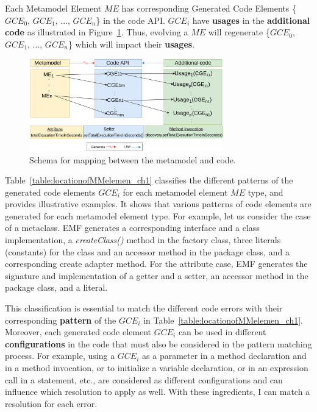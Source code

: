 Each Metamodel Element $ME$ has corresponding Generated Code Elements \{$GCE_0$, $GCE_1$, ..., $GCE_n$\} in the code API. 
$GCE_i$ have \textbf{usages} in the \textbf{additional code} as illustrated in Figure~\ref{fig:patternconcept}.
Thus, evolving a $ME$ will regenerate \{$GCE_0$, $GCE_1$, ..., $GCE_n$\} which will impact their \textbf{usages}. 
%
\begin{figure}[H]
	\centering
	\includegraphics[width=0.75\textwidth]{./pics/chapter1pics/patternusages.png}
	\caption{Schema for mapping between the metamodel and code.}
	\label{fig:patternconcept}
	\vspace{-1em}
	
\end{figure}


Table~\ref{table:locationofMMelemen_ch1} classifies the different patterns of the generated code elements $GCE_i$ for each metamodel element $ME$ type, and provides illustrative examples. It shows that various patterns of code elements are generated for each metamodel element type. %
For example, let us consider the case of a metaclass. EMF generates a corresponding interface and a class implementation, a \emph{createClass()} method in the factory class, three literals (\ie constants) for the class and an accessor method in the package class, and a corresponding create adapter method. For the attribute case, EMF generates the signature and implementation of a getter and a setter, an accessor method in the package class, and a literal. 

This classification is essential to match the different code errors with their corresponding \textbf{pattern} of the $GCE_i$ in Table~\ref{table:locationofMMelemen_ch1}. 
%
Moreover, each generated code element $GCE_i$ can be used in different \textbf{configurations} in the code that must also be considered in the pattern matching process. For example, using a $GCE_i$ as a parameter in a method declaration and in a method invocation, or to initialize a variable declaration, or in an expression call in a statement, etc., are considered as different configurations and can influence which resolution to apply as well. With these ingredients, I can match a resolution for each error. 





